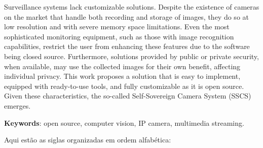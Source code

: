\documentclass[12pt, %
openright, 
oneside, %
a4paper,    %
brazil]{facom-ufu-abntex2}
\begin{document}
\begin{resumo}[Abstract]

	Surveillance systems lack customizable solutions. Despite the existence
	of cameras on the market that handle both recording and storage of images, they
	do so at low resolution and with severe memory space limitations. Even the most
	sophisticated monitoring equipment, such as those with image recognition
	capabilities, restrict the user from enhancing these features due to the
	software being closed source. Furthermore, solutions provided by public or
	private security, when available, may use the collected images for their own
	benefit, affecting individual privacy. This work proposes a solution that is
	easy to implement, equipped with ready-to-use tools, and fully customizable as
	it is open source. Given these characteristics, the so-called Self-Sovereign
	Camera System (SSCS) emerges.

	\vspace{\onelineskip}
	\noindent
	\textbf{Keywords}: open source, computer vision, IP camera, multimedia
	streaming.
\end{resumo}

\listoffigures*
\cleardoublepage

\listoftables*
\cleardoublepage

Aqui estão as siglas organizadas em ordem alfabética:
\end{document}
